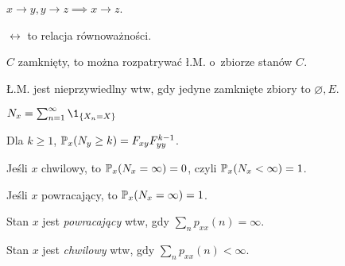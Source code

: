 	\begin{remark}
		$x \to y, y \to z \implies x \to z$.
	\end{remark}
	
	\begin{remark}
		$\leftrightarrow$ to relacja równoważności.
	\end{remark}
	
	\begin{remark}
		$C$ zamknięty, to można rozpatrywać ł.M. o~zbiorze stanów $C$.
	\end{remark}
	
	\begin{remark}
		Ł.M. jest nieprzywiedlny wtw, gdy jedyne zamknięte zbiory 
		to $\varnothing, E$.
	\end{remark}
	
	\begin{definition}
		$N_x = \sum_{n=1}^\infty \1_{\{ X_n = X \}}$
	\end{definition}
	
	\begin{fact}
		Dla $k \geq 1$, $\P_x(N_y \geq k) = F_{xy} F_{yy}^{k-1}$.
	\end{fact}
	
	\begin{corollary}
		Jeśli $x$ chwilowy, to $\P_x(N_x = \infty) = 0$, 
		czyli $\P_x(N_x < \infty) = 1$.
	\end{corollary}
	
	\begin{corollary}
		Jeśli $x$ powracający, to $\P_x(N_x = \infty) = 1$.
	\end{corollary}
	
	\begin{theorem}
		Stan $x$ jest \emph{powracający} 
		wtw, gdy $\sum_n p_{xx}(n) = \infty$.
		
		Stan $x$ jest \emph{chwilowy}
		wtw, gdy $\sum_n p_{xx}(n) < \infty$.
	\end{theorem}





















 
 
